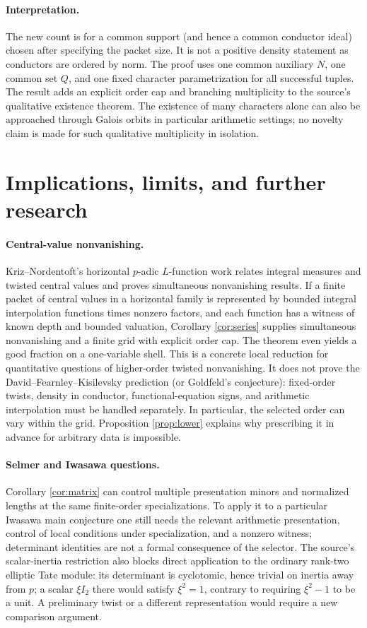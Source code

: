 \documentclass[11pt]{article}
\theoremstyle{remark}\newtheorem{remark}[theorem]{Remark}
\begin{document}
\paragraph{Interpretation.}
The new count is for a common support (and hence a common conductor
ideal) chosen after specifying the packet size. It is not a positive
density statement as conductors are ordered by norm. The proof uses
one common auxiliary $N$, one common set $Q$, and one fixed character
parametrization for all successful tuples. The result adds an explicit
order cap and branching multiplicity to the source's qualitative
existence theorem. The existence of many characters alone can also be
approached through Galois orbits in particular arithmetic settings;
no novelty claim is made for such qualitative multiplicity in isolation.

\section{Implications, limits, and further research}

\paragraph{Central-value nonvanishing.}
Kriz--Nordentoft's horizontal $p$-adic $L$-function work \cite{KN}
relates integral measures and twisted central values and proves
simultaneous nonvanishing results. If a finite packet of central values
in a horizontal family is represented by bounded integral interpolation
functions times nonzero factors, and each function has a witness of
known depth and bounded valuation, Corollary \ref{cor:series} supplies
simultaneous nonvanishing and a finite grid with explicit order cap.
The theorem even yields a good fraction on a one-variable shell.
This is a concrete local reduction for quantitative questions of
higher-order twisted nonvanishing. It does not prove the
David--Fearnley--Kisilevsky prediction (or Goldfeld's conjecture):
fixed-order twists, density in conductor, functional-equation signs,
and arithmetic interpolation must be handled separately. In particular,
the selected order can vary within the grid. Proposition \ref{prop:lower}
explains why prescribing it in advance for arbitrary data is impossible.

\paragraph{Selmer and Iwasawa questions.}
Corollary \ref{cor:matrix} can control multiple presentation minors and
normalized lengths at the same finite-order specializations. To apply
it to a particular Iwasawa main conjecture one still needs the relevant
arithmetic presentation, control of local conditions under specialization,
and a nonzero witness; determinant identities are not a formal
consequence of the selector. The source's scalar-inertia restriction
also blocks direct application to the ordinary rank-two elliptic Tate
module: its determinant is cyclotomic, hence trivial on inertia away
from $p$; a scalar $\xi I_2$ there would satisfy $\xi^2=1$, contrary to
requiring $\xi^2-1$ to be a unit. A preliminary twist or a different
representation would require a new comparison argument.
\end{document}
